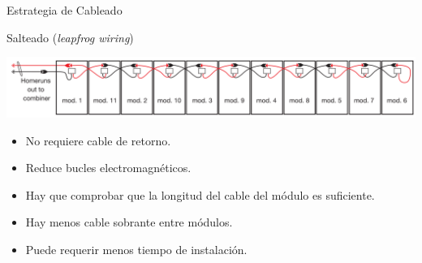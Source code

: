 \documentclass[aspectratio=169, usenames,svgnames,dvipsnames]{beamer}
\begin{document}
\begin{frame}[label={sec:org84c0569}]{Estrategia de Cableado}
\begin{block}{Salteado (\emph{leapfrog wiring})}
\begin{center}
\includegraphics[width=\textwidth]{../figs/LeapfrogWiring.png}
\end{center}

\begin{itemize}
\item No requiere cable de retorno.
\item Reduce bucles electromagnéticos.
\item Hay que comprobar que la longitud del cable del módulo es suficiente.
\item Hay menos cable sobrante entre módulos.
\item Puede requerir menos tiempo de instalación.
\end{itemize}
\end{block}
\end{frame}
\end{document}
